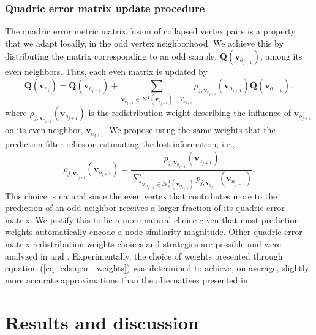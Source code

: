 \documentclass[graybox]{svmult}
\begin{document}
	\subsubsection{Quadric error matrix update procedure}
	The quadric error metric matrix fusion of collapsed vertex pairs is a property that we adapt locally, in the odd vertex neighborhood. We achieve this by distributing the matrix corresponding to an odd sample, $\mathbf{Q}({\mathbf{v}_{o_{j+1}}})$, among its even neighbors. Thus, each even matrix is updated by
	\begin{equation}
	\mathbf{Q}({\mathbf{v}_{e_j}}) = \mathbf{Q}({\mathbf{v}_{e_{j+1}}}) + \sum\limits_{\mathbf{v}_{o_{j+1}} \in \mathcal{N}^1_v(\mathbf{v}_{e_{j+1}}) \cap V_{o_{j+1}} } { \rho_{j, \mathbf{v}_{e_{j+1}} }(  \mathbf{v}_{o_{j+1}}) \mathbf{Q}({ \mathbf{v}_{o_{j+1}}} )} ,
	\label{eq_cds:qem_update}
	\end{equation}
	where $\rho_{j, \mathbf{v}_{e_{j+1}} }(  \mathbf{v}_{o_{j+1}})$ is the redistribution weight describing the influence of $ \mathbf{v}_{o_{j+1}}$ on its even neighbor, $\mathbf{v}_{e_{j+1}}$. We propose using the same weights that the prediction filter relies on estimating the lost information, i.e.,
	\begin{equation}
	\rho_{j, \mathbf{v}_{e_{j+1}} }(  \mathbf{v}_{o_{j+1}}) =  \frac{p_{j, \mathbf{v}_{o_{j+1}} }(  \mathbf{v}_{e_{j+1}})}
	{ \sum_{\mathbf{v}_{u_{j+1}} \in \mathcal{N}^1_v(  \mathbf{v}_{o_{j+1}}) } { p_{j, \mathbf{v}_{o_{j+1}} }(  \mathbf{v}_{u_{j+1}}) }}.
	\label{eq_cds:qem_weights}
	\end{equation} 
	This choice is natural since the even vertex that contributes more to the prediction of an odd neighbor receives a larger fraction of its quadric error matrix. We justify this to be a more natural choice given that most prediction weights automatically encode a node similarity magnitude.
	Other quadric error matrix redistribution weights choices  and strategies are possible and were analyzed in \cite{Cioaca2015} and \cite{Cioaca2016UPB}. Experimentally, the choice of weights presented through equation (\ref{eq_cds:qem_weights}) was determined to achieve, on average, slightly more accurate approximations than the alternatives presented in \cite{Cioaca2016UPB}.
	
	
	\section{Results and discussion}
	
\end{document}
